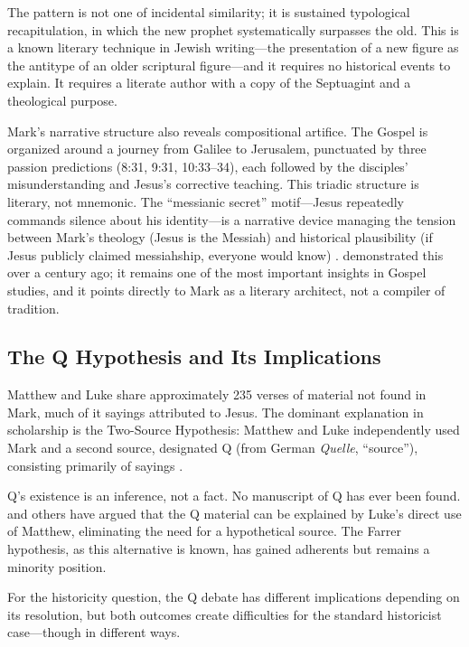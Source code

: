\documentclass[12pt,oneside]{article}
\begin{document}
The pattern is not one of incidental similarity; it is sustained
typological recapitulation, in which the new prophet systematically
surpasses the old.  This is a known literary technique in Jewish
writing---the presentation of a new figure as the antitype of an older
scriptural figure---and it requires no historical events to explain.  It
requires a literate author with a copy of the Septuagint and a
theological purpose.

Mark's narrative structure also reveals compositional artifice.  The
Gospel is organized around a journey from Galilee to Jerusalem,
punctuated by three passion predictions (8:31, 9:31, 10:33--34), each
followed by the disciples' misunderstanding and Jesus's corrective
teaching.  This triadic structure is literary, not mnemonic.  The
``messianic secret'' motif---Jesus repeatedly commands silence about
his identity---is a narrative device managing the tension between
Mark's theology (Jesus is the Messiah) and historical plausibility
(if Jesus publicly claimed messiahship, everyone would know)
\citep{Wrede1901}.  \citet{Wrede1901} demonstrated this over a century
ago; it remains one of the most important insights in Gospel studies,
and it points directly to Mark as a literary architect, not a compiler
of tradition.

\subsection{The Q Hypothesis and Its Implications}
\label{sec:gospels:q}

Matthew and Luke share approximately 235 verses of material not found
in Mark, much of it sayings attributed to Jesus.  The dominant
explanation in scholarship is the Two-Source Hypothesis: Matthew and
Luke independently used Mark and a second source, designated Q (from
German \textit{Quelle}, ``source''), consisting primarily of sayings
\citep{Kloppenborg1987}.

Q's existence is an inference, not a fact.  No manuscript of Q has ever
been found.  \citet{Goodacre2002} and others have argued that the
Q material can be explained by Luke's direct use of Matthew, eliminating
the need for a hypothetical source.  The Farrer hypothesis, as this
alternative is known, has gained adherents but remains a minority
position.

For the historicity question, the Q debate has different implications
depending on its resolution, but both outcomes create difficulties for
the standard historicist case---though in different ways.
\end{document}
